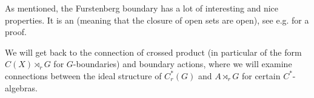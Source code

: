 As mentioned, the Furstenberg boundary has a lot of interesting and nice properties. It is an  (meaning that the closure of open sets are open), see e.g. \cite[Proposition 2.4]{breuillard2017c} for a proof.

We will get back to the connection of crossed product (in particular of the form $C(X) \rtimes_r G$ for $G$-boundaries) and boundary actions, where we will examine connections between the ideal structure of $C_r^*(G)$ and $A \rtimes_r G$ for certain $C^*$-algebras.

